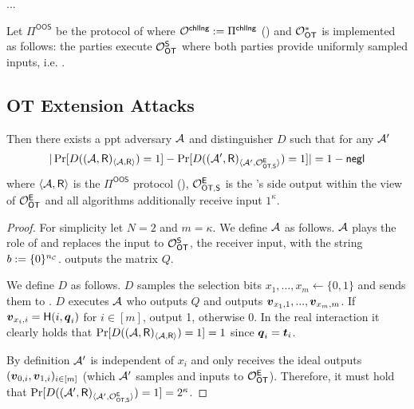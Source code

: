 ...

\begin{definition}\label{def:OOS}
	Let $\Pi^{\textsf{OOS}}$ be the protocol of  where $\mathcal{O}^{\textsf{chllng}}:=\Pi^{\textsf{chllng}}$ () and $\mathcal{O}_{\mathsf{OT}}^*$ is implemented as follows: the parties execute $\mathcal{O}_{\mathsf{OT}}^\mathsf{S}$ where both parties provide uniformly sampled inputs, i.e.  \cite[Protocol 2]{OOS16}.
\end{definition}



\subsection{OT Extension Attacks}


\begin{lemma} 
	Then there exists a ppt adversary $\mathcal{A}$ and distinguisher $D$ such that for any $\mathcal{A}'$ 
	$$
		|\Pr[D((\mathcal{A}, \mathsf{R})_{\langle\mathcal{A},\mathsf{R}\rangle})=1]-\Pr[D((\mathcal{A}', \mathsf{R})_{\langle\mathcal{A}',\mathcal{O}^{\mathsf{E}}_{\textsf{OT,\ensuremath{\mathsf{S}}}}\rangle})=1]|=1-\mathsf{negl}
	$$
	where $\langle\mathcal{A},\mathsf{R}\rangle$ is the $\Pi^{\textsf{OOS}}$ protocol (), $\mathcal{O}^{\mathsf{E}}_{\textsf{OT,\ensuremath{\mathsf{S}}}}$ is the \send's side output within the view of $\mathcal{O}_{\mathsf{OT}}^{\mathsf{E}}$ and all algorithms additionally receive input $1^\kappa$. 
\end{lemma}
\begin{proof} 
	For simplicity let $N=2$ and $m=\kappa$. We define $\mathcal{A}$ as follows. $\mathcal{A}$ plays the role of \send and replaces the input to $\mathcal{O}_{\mathsf{OT}}^\mathsf{S}$, the receiver input, with the string $b:=\{0\}^{{n_\mathcal{C}}}$. \Adv outputs the matrix $Q$.
	
	We define $D$ as follows. $D$ samples the selection bits $x_1,...,x_m\gets\{0,1\}$ and sends them to \rec. $D$ executes $\mathcal{A}$ who outputs $Q$ and \rec outputs $\boldsymbol{v}_{x_1,1},...,\boldsymbol{v}_{x_m,m}$. If $\boldsymbol{v}_{x_i,i}=\mathsf{H}(i,\boldsymbol{q}_i)$ for $i\in[m]$, output 1, otherwise 0. In the real interaction it clearly holds that $\Pr[D((\mathcal{A}, \mathsf{R})_{\langle\mathcal{A},\mathsf{R}\rangle})=1]=1$ since $\boldsymbol{q}_i=\boldsymbol{t}_i$.
	
	By definition $\mathcal{A}'$ is independent of $x_i$ and only receives the ideal outputs $(\boldsymbol{v}_{0,i},\boldsymbol{v}_{1,i})_{i\in [m]}$ (which $\mathcal{A}'$  samples and inputs to $\mathcal{O}_{\mathsf{OT}}^\mathsf{E}$). Therefore, it must hold that $\Pr[D((\mathcal{A}', \mathsf{R})_{\langle\mathcal{A}',\mathcal{O}^{\mathsf{E}}_{\textsf{OT,\ensuremath{\mathsf{S}}}}\rangle})=1]=2^{\kappa}$.
\end{proof}


